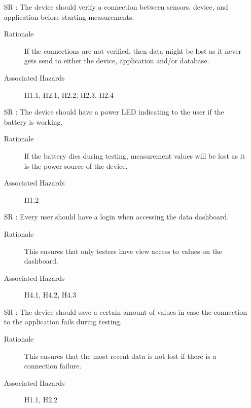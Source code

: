 \documentclass[12pt]{article}
\newcounter{reqnum} %
\begin{document}
\begin{itemize}
  \item[SR \refstepcounter{reqnum}\thereqnum:] The device should verify a connection between sensors, device, and application before starting measurements.
    \begin{description} \item[Rationale] If the connections are not verified, then data might be lost as it never gets send to either the device, application and/or database.  \end{description}
    \begin{description} \item[Associated Hazards] H1.1, H2.1, H2.2, H2.3, H2.4  \end{description}
  
  \item[SR \refstepcounter{reqnum}\thereqnum:] The device should have a power LED indicating to the user if the battery is working.
    \begin{description} \item[Rationale] If the battery dies during testing, measurement values will be lost as it is the power source of the device.  \end{description}
    \begin{description} \item[Associated Hazards] H1.2  \end{description}

  \item[SR \refstepcounter{reqnum}\thereqnum:] Every user should have a login when accessing the data dashboard.
    \begin{description} \item[Rationale] This ensures that only testers have view access to values on the dashboard.   \end{description}
    \begin{description} \item[Associated Hazards] H4.1, H4.2, H4.3 \end{description}
  
  \item[SR \refstepcounter{reqnum}\thereqnum:] The device should save a certain amount of values in case the connection to the application fails during testing.
    \begin{description} \item[Rationale] This ensures that the most recent data is not lost if there is a connection failure.   \end{description}
    \begin{description} \item[Associated Hazards] H1.1, H2.2  \end{description}
  

\end{itemize}
\end{document}
